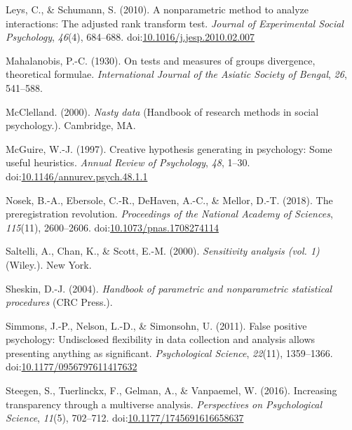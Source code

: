 \documentclass[man,floatsintext]{apa6}
\begin{document}
\leavevmode\hypertarget{ref-Leys_and_Schumann_2010}{}%
Leys, C., \& Schumann, S. (2010). A nonparametric method to analyze interactions: The adjusted rank transform test. \emph{Journal of Experimental Social Psychology}, \emph{46}(4), 684--688. doi:\href{https://doi.org/10.1016/j.jesp.2010.02.007}{10.1016/j.jesp.2010.02.007}

\leavevmode\hypertarget{ref-Mahalanobis_1930}{}%
Mahalanobis, P.-C. (1930). On tests and measures of groups divergence, theoretical formulae. \emph{International Journal of the Asiatic Society of Bengal}, \emph{26}, 541--588.

\leavevmode\hypertarget{ref-McClelland_2000}{}%
McClelland. (2000). \emph{Nasty data} (Handbook of research methods in social psychology.). Cambridge, MA.

\leavevmode\hypertarget{ref-McGuire_1997}{}%
McGuire, W.-J. (1997). Creative hypothesis generating in psychology: Some useful heuristics. \emph{Annual Review of Psychology}, \emph{48}, 1--30. doi:\href{https://doi.org/10.1146/annurev.psych.48.1.1}{10.1146/annurev.psych.48.1.1}

\leavevmode\hypertarget{ref-Nosek_et_al_2018}{}%
Nosek, B.-A., Ebersole, C.-R., DeHaven, A.-C., \& Mellor, D.-T. (2018). The preregistration revolution. \emph{Proceedings of the National Academy of Sciences}, \emph{115}(11), 2600--2606. doi:\href{https://doi.org/10.1073/pnas.1708274114}{10.1073/pnas.1708274114}

\leavevmode\hypertarget{ref-Saltelli_et_al_2000}{}%
Saltelli, A., Chan, K., \& Scott, E.-M. (2000). \emph{Sensitivity analysis (vol. 1)} (Wiley.). New York.

\leavevmode\hypertarget{ref-Sheskin_2004}{}%
Sheskin, D.-J. (2004). \emph{Handbook of parametric and nonparametric statistical procedures} (CRC Press.).

\leavevmode\hypertarget{ref-Simmons_et_al_2011}{}%
Simmons, J.-P., Nelson, L.-D., \& Simonsohn, U. (2011). False positive psychology: Undisclosed flexibility in data collection and analysis allows presenting anything as significant. \emph{Psychological Science}, \emph{22}(11), 1359--1366. doi:\href{https://doi.org/10.1177/0956797611417632}{10.1177/0956797611417632}

\leavevmode\hypertarget{ref-Steegen_et_al_2016}{}%
Steegen, S., Tuerlinckx, F., Gelman, A., \& Vanpaemel, W. (2016). Increasing transparency through a multiverse analysis. \emph{Perspectives on Psychological Science}, \emph{11}(5), 702--712. doi:\href{https://doi.org/10.1177/1745691616658637}{10.1177/1745691616658637}
\end{document}
